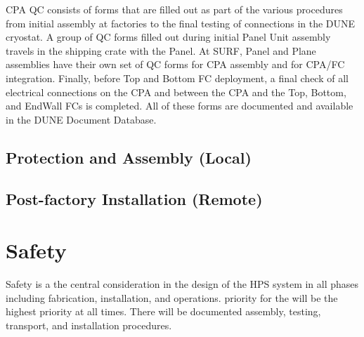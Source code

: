 CPA QC consists of forms that are filled out as part of the various procedures from initial assembly at factories to the final testing of connections in the DUNE cryostat.  A group of QC forms filled out during initial Panel Unit assembly travels in the shipping crate with the Panel.  At SURF, Panel and Plane assemblies have their own set of QC forms for CPA assembly and for CPA/FC integration.  Finally, before Top and Bottom FC deployment, a final check of all electrical connections on the CPA and between the CPA and the Top, Bottom, and EndWall FCs is completed.  All of these forms are documented and available in the DUNE Document Database.

\subsection{Protection and Assembly (Local)}
\label{sec:fdsp-hv-qc-local}


\subsection{Post-factory Installation (Remote)}
\label{sec:fdsp-hv-qc-remote}





\section{Safety}

Safety is a the central consideration in the design of the HPS system in all phases including fabrication, installation, and operations. priority for the will be the highest priority at all times. There will be documented assembly, testing, transport, and installation procedures.

\label{sec:fdsp-hv-safety}






